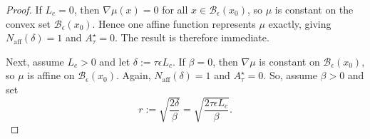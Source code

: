 \documentclass{article}
\theoremstyle{definition}
\begin{document}
\begin{proof}
If $L_c=0$, then $\nabla\mu(x)=0$ for all $x\in\mathcal{B}_\epsilon(x_0)$, so $\mu$ is constant on the convex set $\mathcal{B}_\epsilon(x_0)$. Hence one affine function represents $\mu$ exactly, giving $N_{\mathrm{aff}}(\delta)=1$ and $A_\tau^\star=0$. The result is therefore immediate. 

Next, assume $L_c>0$ and let $\delta:=\tau\epsilon L_c$. If $\beta=0$, then $\nabla\mu$ is constant on $\mathcal{B}_\epsilon(x_0)$, so $\mu$ is affine on $\mathcal{B}_\epsilon(x_0)$. Again, $N_{\mathrm{aff}}(\delta)=1$ and $A_\tau^\star=0$. So, assume $\beta>0$ and set
\begin{equation}
    r:=
    \sqrt{\frac{2\delta}{\beta}}=
    \sqrt{\frac{2\tau\epsilon L_c}{\beta}} .
\end{equation}


\end{proof}
\end{document}
